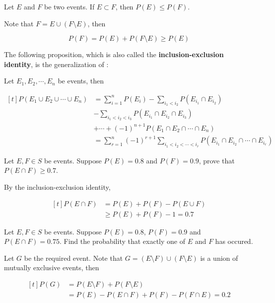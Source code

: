 \documentclass[a4paper,12pt]{article}
\begin{document}
\begin{pst}
  Let $E$ and $F$ be two events. If $E\subset F$, then $P(E)\leq P(F)$.\n

  \prf Note that $F=E\cup(F\setminus E)$, then

  $$P(F)=P(E)+P(F\setminus E)\geq P(E)$$
\end{pst}\n

The following proposition, which is also called the \textbf{inclusion-exclusion identity}, is the generalization of \rpst[\sctd{1}]:\n

\begin{pst}
  Let $E_{1},E_{2},\cdots,E_{n}$ be events, then

  $$\begin{aligned}[t]
    P(E_{1}\cup E_{2}\cup\cdots\cup E_{n})&=\sum_{i=1}^{n}P(E_{i})-\sum_{i_{1}<i_{2}}P(E_{i_{1}}\cap E_{i_{2}})\\
    &-\sum_{i_{1}<i_{2}<i_{3}}P(E_{i_{1}}\cap E_{i_{2}}\cap E_{i_{3}})\\
    &+\cdots+(-1)^{n+1}P(E_{1}\cap E_{2}\cap\cdots\cap E_{n})\\
    &=\sum_{r=1}^{n}(-1)^{r+1}\sum_{i_{1}<i_{2}<\cdots<i_{r}}P(E_{i_{1}}\cap E_{i_{2}}\cap\cdots\cap E_{i_{r}})
  \end{aligned}$$
\end{pst}\n

\begin{exm}
  Let $E,F\in S$ be events. Suppose $P(E)=0.8$ and $P(F)=0.9$, prove that $P(E\cap F)\geq 0.7$.\n

  \ans By the inclusion-exclusion identity,

  $$\begin{aligned}[t]
    P(E\cap F)&=P(E)+P(F)-P(E\cup F)\\
    &\geq P(E)+P(F)-1=0.7
  \end{aligned}$$
\end{exm}\n

\begin{exm}
  Let $E,F\in S$ be events. Suppose $P(E)=0.8$, $P(F)=0.9$ and $P(E\cap F)=0.75$. Find the probability that exactly one of $E$ and $F$ has occured.\n

  \ans Let $G$ be the required event. Note that $G=(E\setminus F)\cup(F\setminus E)$ is a union of mutually exclusive events, then

  $$\begin{aligned}[t]
    P(G)&=P(E\setminus F)+P(F\setminus E)\\
    &=P(E)-P(E\cap F)+P(F)-P(F\cap E)=0.2   
  \end{aligned}$$
\end{exm}
\end{document}
